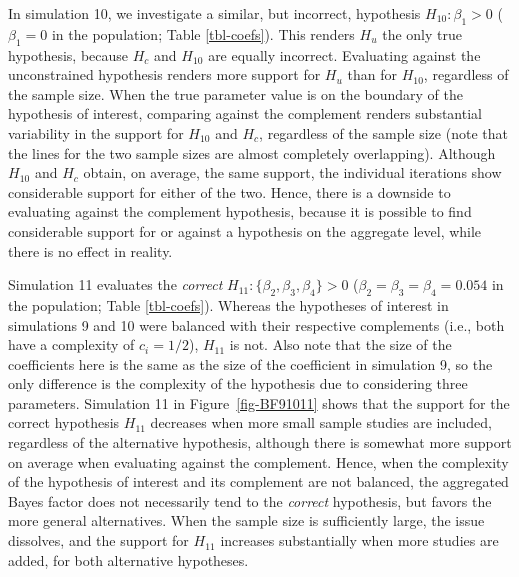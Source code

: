 \documentclass[
]{interact}
\begin{document}
                    In simulation 10, we investigate a similar, but incorrect, hypothesis
                    \(H_{10}: \beta_1 > 0\) (\(\beta_{1}=0\) in the population; Table
                                             \ref{tbl-coefs}). This renders \(H_u\) the only true hypothesis, because
                    \(H_c\) and \(H_{10}\) are equally incorrect. Evaluating against the
                    unconstrained hypothesis renders more support for \(H_u\) than for
                    \(H_{10}\), regardless of the sample size. When the true parameter value
                    is on the boundary of the hypothesis of interest, comparing against the
                    complement renders substantial variability in the support for \(H_{10}\)
                    and \(H_c\), regardless of the sample size (note that the lines for the
                                                                two sample sizes are almost completely overlapping). Although \(H_{10}\)
                    and \(H_c\) obtain, on average, the same support, the individual
                    iterations show considerable support for either of the two. Hence, there
                    is a downside to evaluating against the complement hypothesis, because
                    it is possible to find considerable support for or against a hypothesis
                    on the aggregate level, while there is no effect in reality.
                    
                    Simulation 11 evaluates the \emph{correct}
                    \(H_{11}: \{\beta_2, \beta_3, \beta_4\} > 0\)
                    (\(\beta_2 = \beta_3 = \beta_4 = 0.054\) in the population; Table
                      \ref{tbl-coefs}). Whereas the hypotheses of interest in simulations 9
                    and 10 were balanced with their respective complements (i.e., both have
                                                                            a complexity of \(c_i = 1/2\)), \(H_{11}\) is not. Also note that the
                    size of the coefficients here is the same as the size of the coefficient
                    in simulation 9, so the only difference is the complexity of the
                    hypothesis due to considering three parameters. Simulation 11 in
                    Figure~\ref{fig-BF91011} shows that the support for the correct
                    hypothesis \(H_{11}\) decreases when more small sample studies are
                    included, regardless of the alternative hypothesis, although there is
                    somewhat more support on average when evaluating against the complement.
                    Hence, when the complexity of the hypothesis of interest and its
                    complement are not balanced, the aggregated Bayes factor does not
                    necessarily tend to the \emph{correct} hypothesis, but favors the more
                    general alternatives. When the sample size is sufficiently large, the
                    issue dissolves, and the support for \(H_{11}\) increases substantially
                    when more studies are added, for both alternative hypotheses.
                    
\end{document}
